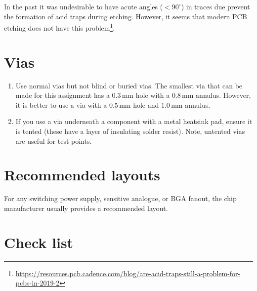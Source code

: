 In the past it was undesirable to have acute angles ($<90^{\circ}$) in
traces due prevent the formation of acid traps during etching.
However, it seems that modern PCB etching does not have this
problem\footnote{\url{https://resources.pcb.cadence.com/blog/are-acid-traps-still-a-problem-for-pcbs-in-2019-2}}.


\section{Vias}


\begin{enumerate}
\item Use normal vias but not blind or buried vias.  The smallest via
  that can be made for this assignment has a 0.3\,mm hole with a
  0.8\,mm annulus.  However, it is better to use a via with a 0.5\,mm
  hole and 1.0\,mm annulus.

\item If you use a via underneath a component with a metal heatsink
  pad, ensure it is tented (these have a layer of insulating solder
  resist).  Note, untented vias are useful for test points.
\end{enumerate}


\section{Recommended layouts}

For any switching power supply, sensitive analogue, or BGA fanout, the
chip manufacturer usually provides a recommended layout.

\section{Check list}
\label{PCB-check-list}

